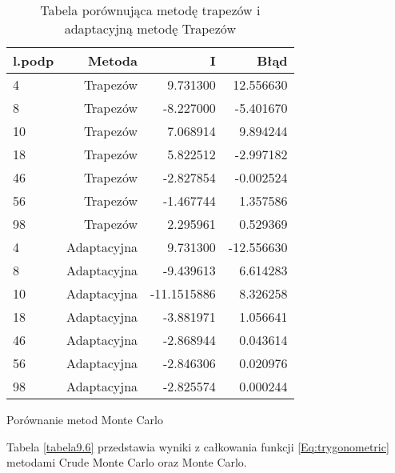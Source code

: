 \documentclass[12pt,twoside]{article}
\begin{document}
\begin{table}[h]
\centering 
\caption{Tabela porównująca metodę trapezów i adaptacyjną metodę Trapezów}
\label{tabela9.5}
\begin{tabular}{lrrr}
\toprule
{l.podp} & Metoda &  I &  Błąd \\
\midrule
4  &     Trapezów & 9.731300  &   12.556630 \\
8  &     Trapezów & -8.227000 &   -5.401670 \\
10  &    Trapezów & 7.068914   &   9.894244  \\
18  &    Trapezów & 5.822512  &   -2.997182  \\
46  &    Trapezów & -2.827854 &    -0.002524   \\
56 &     Trapezów & -1.467744  &   1.357586  \\
98 &     Trapezów & 2.295961 &   0.529369  \\
\midrule
4  &     Adaptacyjna & 9.731300 &   -12.556630 \\
8  &     Adaptacyjna & -9.439613 &   6.614283 \\
10  &    Adaptacyjna & -11.1515886  &   8.326258  \\
18  &    Adaptacyjna & -3.881971 &  1.056641  \\
46  &    Adaptacyjna & -2.868944 &   0.043614  \\
56 &     Adaptacyjna & -2.846306 &    0.020976  \\
98 &     Adaptacyjna & -2.825574 &    0.000244  \\

\bottomrule
\end{tabular}
\end{table}


Porównanie metod Monte Carlo

Tabela \eqref{tabela9.6} przedstawia wyniki z całkowania funkcji \eqref{Eq:trygonometric} metodami Crude Monte Carlo oraz Monte Carlo.
\end{document}
